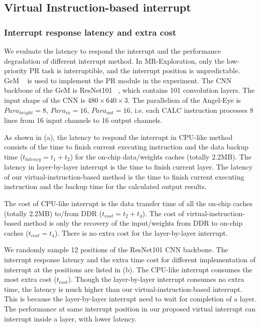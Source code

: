 \subsection{Virtual Instruction-based interrupt }

\subsubsection{ Interrupt response latency and extra cost}


We evaluate the latency to respond the interrupt and the performance degradation of different interrupt method. In MR-Exploration, only the low-priority PR task is interruptible, and the interrupt position is unpredictable. GeM  ~\cite{radenovic2018fine} is used to implement the PR module in the experiment.
The CNN backbone of the GeM is ResNet101  ~\cite{he2016deep}, which contains 101 convolution layers. The input shape of the CNN is $480 \times 640 \times 3$. The parallelism of the Angel-Eye is $Para_{height}=8$, $Para_{in}=16$, $Para_{out}=16$, i.e. each CALC instruction processes 8 lines from 16 input channels to 16 output channels. 

As shown in (a), the latency to respond the interrupt in CPU-like method consists of the time to finish current executing instruction and the data backup time ($t_{latency} = t_1+t_2$) for the on-chip data/weights caches (totally 2.2MB). The latency in layer-by-layer interrupt is the time to finish current layer. The latency of our virtual-instruction-based method is the time to finish current executing instruction and the backup time for the calculated output results. 

The cost of CPU-like interrupt is the data transfer time of all the on-chip caches (totally 2.2MB) to/from DDR ($t_{cost} = t_2+t_4$). The cost of virtual-instruction-based method is only the recovery of the input/weights from DDR to on-chip caches ($t_{cost} = t_4$). There is no extra cost for the layer-by-layer interrupt.



We randomly sample 12 positions of the ResNet101 CNN backbone. The interrupt response latency and the extra time cost for different implementation of interrupt at the positions are listed in (b).
The CPU-like interrupt consumes the most extra cost ($t_{cost}$). Though the layer-by-layer interrupt consumes no extra time, the latency is much higher than our virtual-instruction-based interrupt. 
This is because the layer-by-layer interrupt need to wait for completion of a layer. The performance at same interrupt position in our proposed virtual interrupt can interrupt inside a layer, with lower latency.

